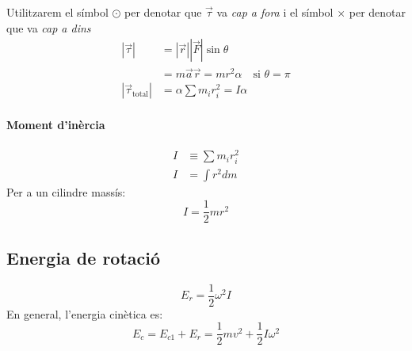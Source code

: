 \begin{center}
\end{center}


Utilitzarem el símbol $\odot$ per denotar que $\vec{\tau}$ va \emph{cap a fora} i el símbol $\times$ per denotar que va \emph{cap a dins}
\begin{align}
    |\vec{\tau}| &= |\vec{r}||\vec{F}|\sin \theta \\
    &= m\vec{a}\vec{r} = m r^2 \alpha \quad \text{si $\theta = \pi$}\\
    |\vec{\tau}_\text{total}| &= \alpha \sum m_i r_i^2 = I\alpha
\end{align}

\paragraph{Moment d'inèrcia}
\begin{align}
    I &\equiv \sum m_i r_i^2 \\
    I &= \int r^2 dm
\end{align}
Per a un cilindre massís:
\begin{equation}
    I = \frac{1}{2}mr^2
\end{equation}

\subsection{Energia de rotació}
\begin{equation}
    E_r = \frac{1}{2}\omega^2I
\end{equation}
En general, l'energia cinètica es:
\begin{equation}
    E_c = E_{c1} + E_r = \frac{1}{2} m v^2 + \frac{1}{2}I\omega^2
\end{equation}

